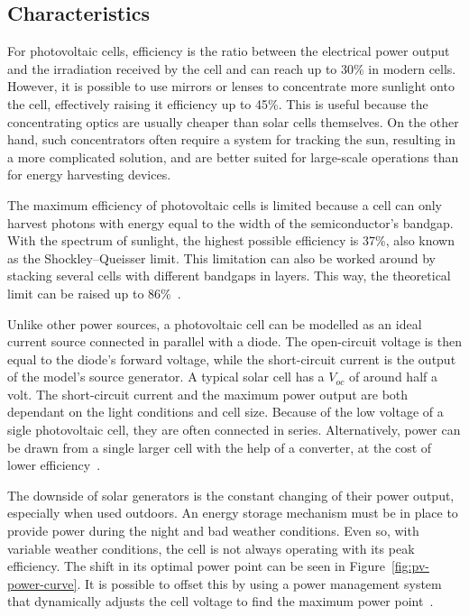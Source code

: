 \documentclass[a4paper,10pt]{article}
\begin{document}
\subsection{Characteristics}

For photovoltaic cells, efficiency is the ratio between the electrical power output and the irradiation received by the cell and can reach up to 30\% in modern cells. However, it is possible to use mirrors or lenses to concentrate more sunlight onto the cell, effectively raising it efficiency up to 45\%. This is useful because the concentrating optics are usually cheaper than solar cells themselves. On the other hand, such concentrators often require a system for tracking the sun, resulting in a more complicated solution, and are better suited for large-scale operations than for energy harvesting devices. 

The maximum efficiency of photovoltaic cells is limited because a cell can only harvest photons with energy equal to the width of the semiconductor's bandgap. With the spectrum of sunlight, the highest possible efficiency is 37\%, also known as the Shockley–Queisser limit. This limitation can also be worked around by stacking several cells with different bandgaps in layers. This way, the theoretical limit can be raised up to 86\%~\cite{wiki:solar-cells}. 

Unlike other power sources, a photovoltaic cell can be modelled as an ideal current source connected in parallel with a diode. The open-circuit voltage is then equal to the diode's forward voltage, while the short-circuit current is the output of the model's source generator. A typical solar cell has a $V_{oc}$ of around half a volt. The short-circuit current and the maximum power output are both dependant on the light conditions and cell size. Because of the low voltage of a sigle photovoltaic cell, they are often connected in series. Alternatively, power can be drawn from a single larger cell with the help of a converter, at the cost of lower efficiency~\cite{Burgoine11}. 

The downside of solar generators is the constant changing of their power output, especially when used outdoors. An energy storage mechanism must be in place to provide power during the night and bad weather conditions. Even so, with variable weather conditions, the cell is not always operating with its peak efficiency. The shift in its optimal power point can be seen in Figure~\ref{fig:pv-power-curve}. It is possible to offset this by using a power management system that dynamically adjusts the cell voltage to find the maximum power point~\cite{solar-mppt-ieee}. 
\end{document}
